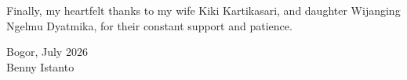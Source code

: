 Finally, my heartfelt thanks to my wife Kiki Kartikasari, and daughter
Wijanging Ngelmu Dyatmika, for their constant support and patience.

\vspace{\baselineskip}
\begin{flushright}
Bogor, July 2026\\[\baselineskip]
Benny Istanto
\end{flushright}
\clearpage

\thispagestyle{empty}\null\clearpage

\restoregeometry

\pagestyle{empty}
\tableofcontents
\clearpage
\pagestyle{fancy}
{}
\listoftables
\vspace{1.5\baselineskip}
{}
\listoffigures
\vspace{1.5\baselineskip}
{}
\listofappx
\clearpage
